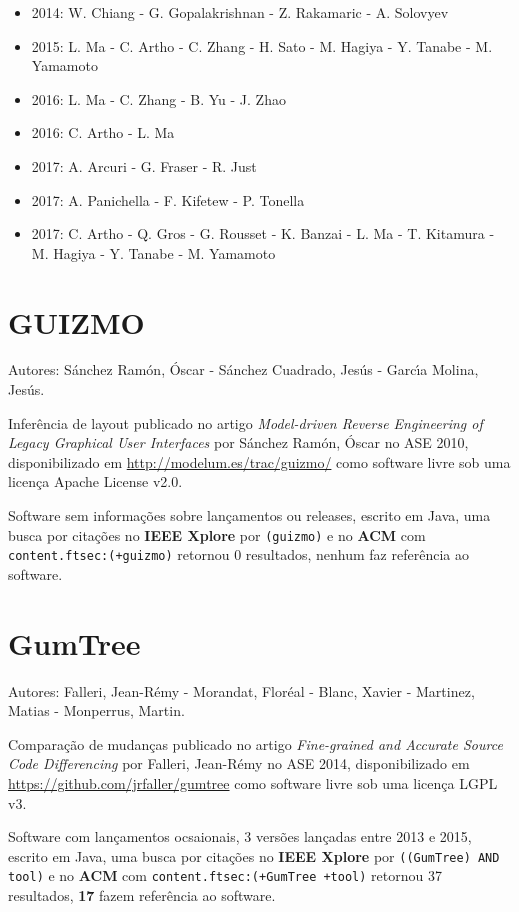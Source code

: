 \begin{itemize}
\item 2014: W. Chiang - G. Gopalakrishnan - Z. Rakamaric - A. Solovyev
\item 2015: L. Ma - C. Artho - C. Zhang - H. Sato - M. Hagiya - Y. Tanabe - M. Yamamoto
\item 2016: L. Ma - C. Zhang - B. Yu - J. Zhao
\item 2016: C. Artho - L. Ma
\item 2017: A. Arcuri - G. Fraser - R. Just
\item 2017: A. Panichella - F. Kifetew - P. Tonella
\item 2017: C. Artho - Q. Gros - G. Rousset - K. Banzai - L. Ma - T. Kitamura - M. Hagiya - Y. Tanabe - M. Yamamoto
\end{itemize}

\section{GUIZMO}

Autores:
S\'{a}nchez Ram\'{o}n, \'{O}scar - S\'{a}nchez Cuadrado, Jes\'{u}s - Garc\'{\i}a Molina, Jes\'{u}s.

Inferência de layout
publicado no artigo {\it Model-driven Reverse Engineering of Legacy Graphical User Interfaces}
por S\'{a}nchez Ram\'{o}n, \'{O}scar
no ASE 2010,
disponibilizado em \url{http://modelum.es/trac/guizmo/}
como software livre
sob uma licença Apache License v2.0.

Software sem informações sobre lançamentos ou releases,
escrito em Java,
uma busca por citações no {\bf IEEE Xplore} por
\texttt{(guizmo)}
e no {\bf ACM} com
\texttt{content.ftsec:(+guizmo)}
retornou
0 resultados,
nenhum faz referência ao software.


\section{GumTree}

Autores:
Falleri, Jean-R{\'e}my - Morandat, Flor{\'e}al - Blanc, Xavier - Martinez, Matias - Monperrus, Martin.

Comparação de mudanças
publicado no artigo {\it Fine-grained and Accurate Source Code Differencing}
por Falleri, Jean-R{\'e}my
no ASE 2014,
disponibilizado em \url{https://github.com/jrfaller/gumtree}
como software livre
sob uma licença LGPL v3.

Software com lançamentos ocsaionais,
3 versões lançadas
entre 2013 e 2015,
escrito em Java,
uma busca por citações no {\bf IEEE Xplore} por
\texttt{((GumTree) AND tool)}
e no {\bf ACM} com
\texttt{content.ftsec:(+GumTree +tool)}
retornou
37 resultados,
{\bf 17} fazem referência ao software.


